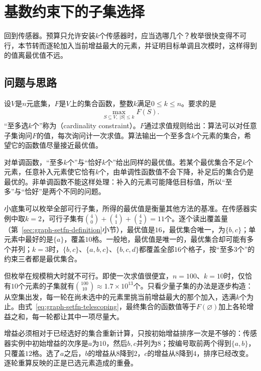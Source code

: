 
\section{基数约束下的子集选择}
\label{sec:graph-cardinality-selection}

回到传感器。预算只允许安装$k$个传感器时，应当选哪几个？枚举很快变得不可行，本节转而逐轮加入当前增益最大的元素，并证明目标单调且次模时，这样得到的值离最优值不远。

\subsection{问题与思路}
\label{sec:graph-setfn-cardinality-problem}

设$V$是$n$元底集，$F$是$V$上的集合函数，整数$k$满足$0\leq k\leq n$。要求的是
\begin{equation}
  \max_{S\subseteq V,\ |S|\leq k}F(S).
  \label{eq:graph-setfn-cardinality-problem}
\end{equation}
“至多选$k$个”称为（cardinality constraint）。$F$通过求值规则给出：算法可以对任意子集询问$F$的值，每次询问计一次求值。算法输出一个至多含$k$个元素的集合，希望它的函数值尽量接近最优值。

对单调函数，“至多$k$个”与“恰好$k$个”给出同样的最优值。若某个最优集合不足$k$个元素，任意补入元素使它恰有$k$个，由单调性函数值不会下降，补足后的集合仍是最优的。非单调函数不能这样处理：补入的元素可能降低目标值，所以“至多”与“恰好”是两个不同的问题。

小底集可以枚举全部可行子集，所得的最优值是衡量其他方法的基准。在传感器实例中取$k=2$，可行子集有$\binom40+\binom41+\binom42=11$个。逐个读出覆盖量（第~\ref{sec:graph-setfn-definition}小节），最优值是$16$，最优集合唯一，为$\{b,c\}$；单元素中最好的是$\{a\}$，覆盖$10$格。一般地，最优值是唯一的，最优集合却可能有多个并列；$k=3$时，$\{b,c\}$、$\{a,b,c\}$、$\{b,c,d\}$都覆盖全部$16$个格子，按“至多$3$个”的约束三者都是最优集合。

但枚举在规模稍大时就不可行。即使一次求值很便宜，$n=100$、$k=10$时，仅恰有$10$个元素的子集就有$\binom{100}{10}\approx1.7\times10^{13}$个。只看少量子集的办法是逐步构造：从空集出发，每一轮在尚未选中的元素里挑当前增益最大的那个加入，选满$k$个为止。由式~\eqref{eq:graph-setfn-telescoping}，最终集合的函数值等于$F(\varnothing)$加上各轮增益之和，每一轮都让其中一项尽量大。

增益必须相对于已经选好的集合重新计算，只按初始增益排序一次是不够的：传感器实例中初始增益的次序是$a$为$10$，然后$b,c$并列为$8$；按编号取前两个得到$\{a,b\}$，只覆盖$12$格。选了$a$之后，$b$的增益从$8$降到$2$，$c$的增益从$8$降到$4$，排序已经改变。逐轮重算反映的正是已选元素造成的重叠。


